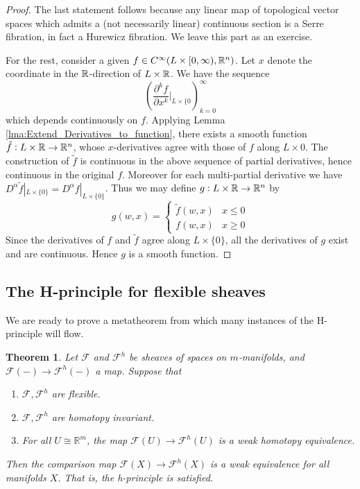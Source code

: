 \documentclass{article}
\newtheorem{theorem}{Theorem}[section]
\newtheorem{proposed work}[theorem]{Proposed Work}
\theoremstyle{definition}
\begin{document}
\begin{proof}
	The last statement follows because any linear map of topological vector spaces which admits a (not necessarily linear) continuous section is a Serre fibration, in fact a Hurewicz fibration. We leave this part as an exercise.  
	
	For the rest, consider a given $f \in C^\infty(L \times [0,\infty), \mathbb R^n)$. Let $x$ denote the coordinate in the $\mathbb R$-direction of $L \times \mathbb R$. We have the sequence
	\begin{equation*}
		\left( \frac{\partial^k f}{\partial x^k}|_{L \times \{0}  \right)_{k=0}^\infty
	\end{equation*}
	which depends continuously on $f$. Applying Lemma \ref{lma:Extend_Derivatives_to_function}, there exists a smooth function $\tilde{f}: L \times \mathbb R \to \mathbb R^n$, whose $x$-derivatives agree with those of $f$ along $L \times {0}$. The construction of $\tilde{f}$ is continuous in the above sequence of partial derivatives, hence continuous in the original $f$. Moreover for each multi-partial derivative we have $D^\alpha \tilde{f}|_{L \times \{0\}} = D^\alpha f|_{L \times \{0\}}$. Thus we may define $g:L \times \mathbb R \to \mathbb R^n$ by
	\begin{equation*}
		g(w,x) = \begin{cases}
			\tilde{f} (w,x) & x \leq 0 \\
			f(w,x) & x \geq 0
		\end{cases}
	\end{equation*}
Since the derivatives of $f$ and $\tilde{f}$ agree along $L \times \{0\}$, all the derivatives of $g$ exist and are continuous. Hence $g$ is a smooth function.
\end{proof}

\subsection{The H-principle for flexible sheaves}

We are ready to prove a metatheorem from which many instances of the H-principle will flow.

\begin{theorem}\label{thm:flexible-h-princ}
Let $\mathcal{F}$ and $\mathcal{F}^h$ be sheaves of spaces on $m$-manifolds, and $\mathcal F(-) \to \mathcal F^h(-)$ a map. Suppose that

\begin{enumerate}
\item $\mathcal F, \mathcal F^h$ are flexible.
\item $\mathcal F, \mathcal F^h$ are homotopy invariant.
\item For all $U \cong \mathbb R^m$, the map $\mathcal F(U) \to \mathcal F^h(U)$ is a weak homotopy equivalence.
\end{enumerate}

Then the comparison map $\mathcal F(X) \to \mathcal F^h(X)$ is a weak equivalence for all manifolds $X$. That is, the h-principle is satisfied.
\end{theorem}
\end{document}
